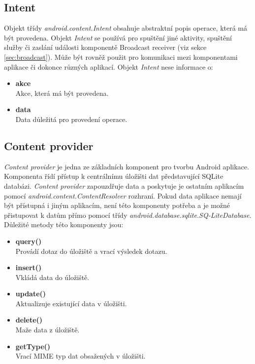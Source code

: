 \documentclass{diplomka}
\begin{document}
\subsection{Intent}
Objekt třídy \emph{android.content.Intent} obsahuje abstraktní popis operace, která má být provedena. Objekt \emph{Intent} se používá pro spuštění jiné aktivity, spuštění služby či zaslání události komponentě Broadcast receiver (viz sekce \ref{sec:broadcast}). Může být rovněž použit pro komunikaci mezi komponentami aplikace či dokonce různých aplikací. Objekt \emph{Intent} nese informace o:

\begin{itemize}[]
\item \textbf{akce}\\ Akce, která má být provedena.
\item \textbf{data}\\ Data důležitá pro provedení operace.
\end{itemize}


\subsection{Content provider}
\emph{Content provider} je jedna ze základních komponent pro tvorbu Android aplikace. Komponenta řídí přístup k centrálnímu úložišti dat představující SQLite databázi. \emph{Content provider} zapouzdřuje data a poskytuje je ostatním aplikacím pomocí \emph{android.content.ContentResolver} rozhraní. Pokud data aplikace nemají být přístupná i jiným aplikacím, není této komponenty potřeba a je možné přistupovat k datům přímo pomocí třídy \emph{android.database.sqlite.SQ-LiteDatabase}. Důležité metody této komponenty jsou:

\begin{itemize}[]
\item \textbf{query()}\\
Provádí dotaz do úložiště a vrací výsledek dotazu.
\item \textbf{insert()}\\
Vkládá data do úložiště.
\item \textbf{update()}\\
Aktualizuje existující data v úložišti.
\item \textbf{delete()}\\
Maže data z úložiště.
\item \textbf{getType()}\\
Vrací MIME typ dat obsažených v úložišti.
\end{itemize}
\end{document}
